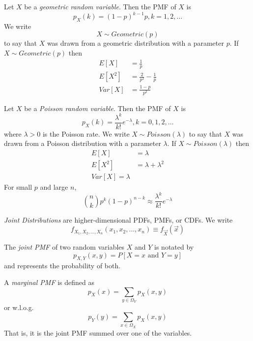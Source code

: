 Let $X$ be a \emph{geometric random variable}. Then the
PMF of $X$ is
\begin{equation}
    p_X(k) = (1 - p)^{k - 1}p, k=1,2,\dots
\end{equation}
We write
\begin{equation}
    X \sim Geometric(p)
\end{equation}
to say that $X$ was drawn from a geometric
distribution with a parameter $p$.
If $X \sim Geometric(p)$ then
\begin{align}
    E[X]   & = \frac{1}{p}                 \\
    E[X^2] & = \frac{2}{p^2} - \frac{1}{p} \\
    Var[X] & = \frac{1 - p}{p^2}
\end{align}

Let $X$ be a \emph{Poisson random variable}. Then the PMF
of $X$ is
\begin{equation}
    p_X(k) = \frac{\lambda^k}{k!}e^{-\lambda}, k=0, 1, 2,\dots
\end{equation}
where $\lambda > 0$ is the Poisson rate. We write
$X \sim Poisson(\lambda)$ to say that $X$ was drawn from
a Poisson distribution with a parameter $\lambda$.
If $X \sim Poisson(\lambda)$ then
\begin{align}
    E[X]   & = \lambda             \\
    E[X^2] & = \lambda + \lambda^2 \\
    Var[X] = \lambda
\end{align}
For small $p$ and large $n$,
\begin{equation}
    {n\choose k}p^k(1-p)^{n-k} \approx \frac{\lambda^k}{k!}e^{-\lambda}
\end{equation}

\emph{Joint Distributions} are higher-dimensional
PDFs, PMFs, or CDFs. We write
\begin{equation}
    f_{X_1, X_2, \dots, X_n}(x_1, x_2, \dots, x_n) \equiv f_{\vec{X}}(\vec{x})
\end{equation}

The \emph{joint PMF} of two random variables
$X$ and $Y$ is notated by
\begin{equation}
    p_{X,Y}(x,y)=P[X=x \text{ and } Y=y]
\end{equation}
and represents the probability of both.

A \emph{marginal PMF} is defined as
\begin{equation}
    p_X(x) = \sum_{y\in \Omega_Y} p_X(x,y)
\end{equation}
or w.l.o.g.
\begin{equation}
    p_Y(y) = \sum_{x\in \Omega_X} p_X(x,y)
\end{equation}
That is, it is the joint PMF summed over
one of the variables.


